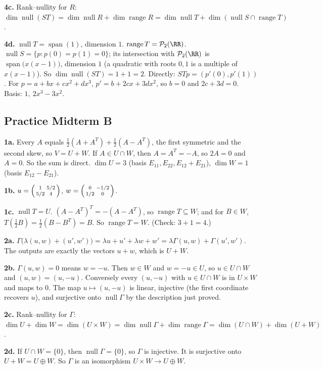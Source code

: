 \documentclass[11pt]{scrartcl}
\DeclareMathOperator{\nul}{null}
\DeclareMathOperator{\range}{range}
\DeclareMathOperator{\spn}{span}
\newcommand{\PP}{\mathcal P}
\begin{document}
\textbf{4c.} Rank--nullity for $R$: $\dim\nul(ST)=\dim\nul R+\dim\range R=\dim\nul T+\dim(\nul S\cap\range T)$.

\textbf{4d.} $\nul T=\spn(1)$, dimension $1$. $\range T=\PP_2(\RR)$.
$\nul S=\{p:p(0)=p(1)=0\}$; its intersection with $\PP_2(\RR)$ is $\spn\big(x(x-1)\big)$, dimension $1$ (a quadratic with roots $0,1$ is a multiple of $x(x-1)$).
So $\dim\nul(ST)=1+1=2$.
Directly: $STp=(p'(0),p'(1))$. For $p=a+bx+cx^2+dx^3$, $p'=b+2cx+3dx^2$, so $b=0$ and $2c+3d=0$. Basis: $1,\ 2x^3-3x^2$.

\subsection*{Practice Midterm B}
\textbf{1a.} Every $A$ equals $\tfrac12(A+A^T)+\tfrac12(A-A^T)$, the first symmetric and the second skew, so $V=U+W$.
If $A\in U\cap W$, then $A=A^T=-A$, so $2A=0$ and $A=0$. So the sum is direct.
$\dim U=3$ (basis $E_{11},E_{22},E_{12}+E_{21}$), $\dim W=1$ (basis $E_{12}-E_{21}$).

\textbf{1b.} $u=\begin{psmallmatrix}1&5/2\\5/2&4\end{psmallmatrix}$, $w=\begin{psmallmatrix}0&-1/2\\1/2&0\end{psmallmatrix}$.

\textbf{1c.} $\nul T=U$. $(A-A^T)^T=-(A-A^T)$, so $\range T\subseteq W$; and for $B\in W$, $T(\tfrac12B)=\tfrac12(B-B^T)=B$. So $\range T=W$. (Check: $3+1=4$.)

\textbf{2a.} $\Gamma\big(\lambda(u,w)+(u',w')\big)=\lambda u+u'+\lambda w+w'=\lambda\Gamma(u,w)+\Gamma(u',w')$. The outputs are exactly the vectors $u+w$, which is $U+W$.

\textbf{2b.} $\Gamma(u,w)=0$ means $w=-u$. Then $w\in W$ and $w=-u\in U$, so $u\in U\cap W$ and $(u,w)=(u,-u)$. Conversely every $(u,-u)$ with $u\in U\cap W$ is in $U\times W$ and maps to $0$.
The map $u\mapsto(u,-u)$ is linear, injective (the first coordinate recovers $u$), and surjective onto $\nul\Gamma$ by the description just proved.

\textbf{2c.} Rank--nullity for $\Gamma$: $\dim U+\dim W=\dim(U\times W)=\dim\nul\Gamma+\dim\range\Gamma=\dim(U\cap W)+\dim(U+W)$.

\textbf{2d.} If $U\cap W=\{0\}$, then $\nul\Gamma=\{0\}$, so $\Gamma$ is injective. It is surjective onto $U+W=U\oplus W$. So $\Gamma$ is an isomorphism $U\times W\to U\oplus W$.
\end{document}
